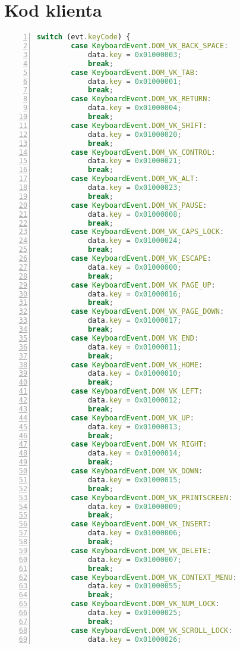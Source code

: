 \section{Kod klienta}

\begin{lstlisting}[language=JavaScript,numbers=left,caption={Fragment metody translacji kodów klawiatury},label={lst:addons_keyboard_method}]
    switch (evt.keyCode) {
        case KeyboardEvent.DOM_VK_BACK_SPACE:
            data.key = 0x01000003;
            break;
        case KeyboardEvent.DOM_VK_TAB:
            data.key = 0x01000001;
            break;
        case KeyboardEvent.DOM_VK_RETURN:
            data.key = 0x01000004;
            break;
        case KeyboardEvent.DOM_VK_SHIFT:
            data.key = 0x01000020;
            break;
        case KeyboardEvent.DOM_VK_CONTROL:
            data.key = 0x01000021;
            break;
        case KeyboardEvent.DOM_VK_ALT:
            data.key = 0x01000023;
            break;
        case KeyboardEvent.DOM_VK_PAUSE:
            data.key = 0x01000008;
            break;
        case KeyboardEvent.DOM_VK_CAPS_LOCK:
            data.key = 0x01000024;
            break;
        case KeyboardEvent.DOM_VK_ESCAPE:
            data.key = 0x01000000;
            break;
        case KeyboardEvent.DOM_VK_PAGE_UP:
            data.key = 0x01000016;
            break;
        case KeyboardEvent.DOM_VK_PAGE_DOWN:
            data.key = 0x01000017;
            break;
        case KeyboardEvent.DOM_VK_END:
            data.key = 0x01000011;
            break;
        case KeyboardEvent.DOM_VK_HOME:
            data.key = 0x01000010;
            break;
        case KeyboardEvent.DOM_VK_LEFT:
            data.key = 0x01000012;
            break;
        case KeyboardEvent.DOM_VK_UP:
            data.key = 0x01000013;
            break;
        case KeyboardEvent.DOM_VK_RIGHT:
            data.key = 0x01000014;
            break;
        case KeyboardEvent.DOM_VK_DOWN:
            data.key = 0x01000015;
            break;
        case KeyboardEvent.DOM_VK_PRINTSCREEN:
            data.key = 0x01000009;
            break;
        case KeyboardEvent.DOM_VK_INSERT:
            data.key = 0x01000006;
            break;
        case KeyboardEvent.DOM_VK_DELETE:
            data.key = 0x01000007;
            break;
        case KeyboardEvent.DOM_VK_CONTEXT_MENU:
            data.key = 0x01000055;
            break;
        case KeyboardEvent.DOM_VK_NUM_LOCK:
            data.key = 0x01000025;
            break;
        case KeyboardEvent.DOM_VK_SCROLL_LOCK:
            data.key = 0x01000026;

\end{lstlisting}
